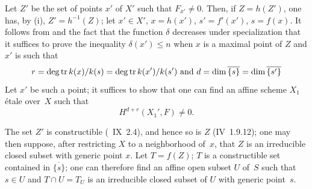 Let $Z'$ be the set of points $x'$ of $X'$ such that $F_{\bar{x}'} \neq 0$. Then, if $Z=h(Z')$, one has, by \textup{(i)}, $Z' = h^{-1}(Z)$; let $x' \in X'$, $x=h(x')$, $s'=f'(x')$, $s=f(x)$. It follows from  and the fact that the function $\delta$ decreases under specialization that it suffices to prove the inequality $\delta(x') \leq n$ when $x$ is a maximal point of $Z$ and $x'$ is such that
$$r=\deg \operatorname{tr} k(x)/k(s) = \deg \operatorname{tr} k(x')/k(s') \text{ and }d=\dim \overline{\{s\}} = \dim\overline{\{s'\}}$$
Let $x'$ be such a point; it suffices to show that one can find an affine scheme $X_1$ \'{e}tale over~$X$ such that
$$
H^{d+r}(X_1', F) \neq 0.
$$

The set $Z'$ is constructible (~IX~2.4), and hence so is $Z$ (\EGA IV~1.9.12); one may then suppose, after restricting $X$ to a neighborhood of~$x$, that $Z$ is an irreducible closed subset with generic point $x$. Let $T=f(Z)$; $T$ is a constructible set contained in $\overline{\{s\}}$; one can therefore find an affine open subset $U$ of~$S$ such that $s \in U$ and $T \cap U = T_U$ is an irreducible closed subset of $U$ with generic point~$s$.

